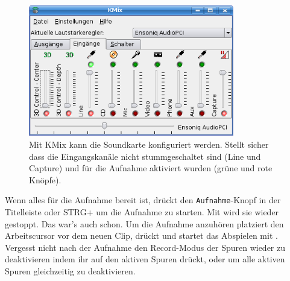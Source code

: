 \begin{figure}
 \centering\includegraphics[width=0.8\textwidth]{../images/kmix01.png}
 \caption{Mit KMix kann die Soundkarte konfiguriert werden. Stellt sicher dass die Eingangskanäle nicht stummgeschaltet sind (Line und Capture) und für die Aufnahme aktiviert wurden (grüne und rote Knöpfe).}
 \label{fig_kmix01}
\end{figure}

Wenn alles für die Aufnahme bereit ist, drückt den \texttt{Aufnahme}-Knopf in der Titelleiste oder STRG+ um die Aufnahme zu starten. Mit  wird sie wieder gestoppt. Das war's auch schon. Um die Aufnahme anzuhören platziert den Arbeitscursor vor dem neuen Clip, drückt  und startet das Abspielen mit . Vergesst nicht nach der Aufnahme den Record-Modus der Spuren wieder zu deaktivieren indem ihr  auf den aktiven Spuren drückt, oder  um alle aktiven Spuren gleichzeitig zu deaktivieren.
